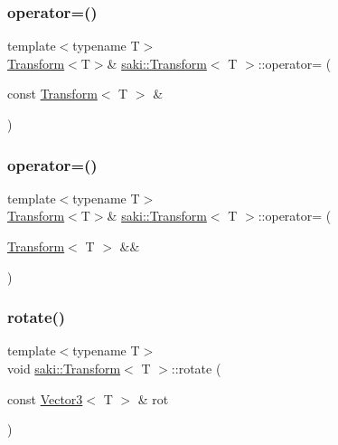\subsubsection{\texorpdfstring{operator=()}{operator=()}\hspace{0.1cm}{\footnotesize\ttfamily [1/2]}}
{\footnotesize\ttfamily template$<$typename T$>$ \\
\mbox{\hyperlink{classsaki_1_1_transform}{Transform}}$<$T$>$\& \mbox{\hyperlink{classsaki_1_1_transform}{saki\+::\+Transform}}$<$ T $>$\+::operator= (\begin{DoxyParamCaption}\item[{const \mbox{\hyperlink{classsaki_1_1_transform}{Transform}}$<$ T $>$ \&}]{ }\end{DoxyParamCaption})\hspace{0.3cm}{\ttfamily [default]}}

\mbox{\label{classsaki_1_1_transform_a66ea10234a845d96e63bbb9c2a1050eb}} 
\subsubsection{\texorpdfstring{operator=()}{operator=()}\hspace{0.1cm}{\footnotesize\ttfamily [2/2]}}
{\footnotesize\ttfamily template$<$typename T$>$ \\
\mbox{\hyperlink{classsaki_1_1_transform}{Transform}}$<$T$>$\& \mbox{\hyperlink{classsaki_1_1_transform}{saki\+::\+Transform}}$<$ T $>$\+::operator= (\begin{DoxyParamCaption}\item[{\mbox{\hyperlink{classsaki_1_1_transform}{Transform}}$<$ T $>$ \&\&}]{ }\end{DoxyParamCaption})\hspace{0.3cm}{\ttfamily [default]}}

\mbox{\label{classsaki_1_1_transform_aa46a720684261bebf4305724817ac053}} 
\subsubsection{\texorpdfstring{rotate()}{rotate()}}
{\footnotesize\ttfamily template$<$typename T$>$ \\
void \mbox{\hyperlink{classsaki_1_1_transform}{saki\+::\+Transform}}$<$ T $>$\+::rotate (\begin{DoxyParamCaption}\item[{const \mbox{\hyperlink{classsaki_1_1_vector3}{Vector3}}$<$ T $>$ \&}]{rot }\end{DoxyParamCaption})\hspace{0.3cm}{\ttfamily [inline]}}



